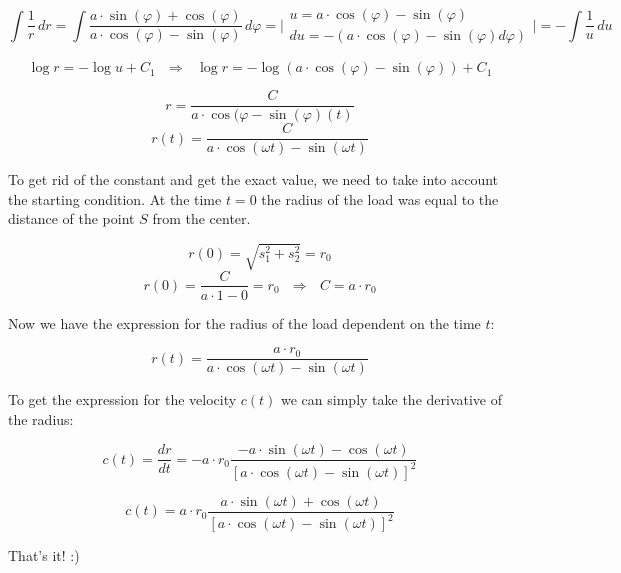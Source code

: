 \documentclass[11pt]{article}
\begin{document}

\[ \int \frac{1}{r} \,dr = \int \frac{a\cdot \sin(\varphi)+\cos(\varphi)}{a\cdot \cos(\varphi)-\sin(\varphi)} \,d\varphi = \Bigg| \begin{array}{ll}
                  u = a\cdot \cos(\varphi) - \sin(\varphi)\\
                  du = -(a\cdot \cos(\varphi) - \sin(\varphi)d\varphi)
                \end{array}
                \Bigg|= - \int \frac{1}{u} \,du
\]

\[ \log{r} = -\log{u} + C_1 \ \ \ \Rightarrow \ \ \ \log{r} = -\log{(a\cdot \cos(\varphi) - \sin(\varphi))} + C_1\]

\[ r = \frac{C}{a\cdot \cos(\varphi - \sin(\varphi)(t)}\]
\[ r(t) = \frac{C}{a\cdot \cos(\omega t) - \sin(\omega t)}\]

To get rid of the constant and get the exact value, we need to take into account the starting condition. At the time $t=0$ the radius of the load was equal to the distance of the point $S$ from the center.

\[ r(0) = \sqrt{s_1^2 + s_2^2} = r_0 \]
\[ r(0) = \frac{C}{a\cdot 1 - 0} = r_0 \ \ \ \Rightarrow \ \ \ C = a\cdot r_0 \]

Now we have the expression for the radius of the load dependent on the time $t$:

\[ r(t) = \frac{a\cdot r_0}{a\cdot \cos(\omega t) - \sin(\omega t)}\]

To get the expression for the velocity $c(t)$ we can simply take the derivative of the radius:

\[ c(t) = \frac{dr}{dt} = -a\cdot r_0 \frac{-a\cdot \sin(\omega t) - \cos(\omega t)}{[a\cdot \cos(\omega t) - \sin(\omega t)]^2}\]

\[ c(t) = a\cdot r_0 \frac{a\cdot \sin(\omega t) + \cos(\omega t)}{[a\cdot \cos(\omega t) - \sin(\omega t)]^2} \]

That's it! :)
\end{document}
